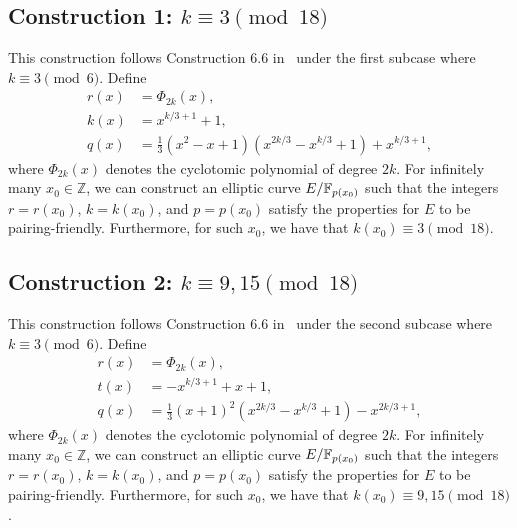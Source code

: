 
\subsection{Construction 1: $k \equiv 3 \pmod{18}$}
This construction follows Construction 6.6 in~\cite{2010/freeman}
under the first subcase where $k \equiv 3 \pmod{6}$.
Define
\begin{align*}
r(x) &= \Phi_{2k}(x),	\\
k(x) &= x^{k/3+1} + 1,	\\
q(x) &= \frac{1}{3} (x^2 - x + 1) (x^{2k/3} - x^{k/3} + 1) + x^{k/3+1},
\end{align*}
where $\Phi_{2k}(x)$ denotes the cyclotomic polynomial of degree $2k$. For infinitely many $x_{0}\in \mathbb{Z}$, we can construct an elliptic curve $E/\mathbb{F}_{p(x_{0})}$ such that the integers $r=r(x_{0})$, $k=k(x_{0})$, and $p=p(x_{0})$ satisfy the properties for $E$ to be pairing-friendly. Furthermore, for such $x_{0}$, we have that $k(x_{0}) \equiv 3 \pmod{18}$.


\subsection{Construction 2: $k \equiv 9,15 \pmod{18}$}
This construction follows Construction 6.6 in~\cite{2010/freeman}
under the second subcase where $k \equiv 3 \pmod{6}$.
Define
\begin{align*}
r(x) &= \Phi_{2k}(x),	\\
t(x) &= -x^{k/3+1} + x + 1,	\\
q(x) &= \frac{1}{3} (x+1)^2 (x^{2k/3} - x^{k/3} + 1) - x^{2k/3+1},
\end{align*}
where $\Phi_{2k}(x)$ denotes the cyclotomic polynomial of degree $2k$. For infinitely many $x_{0}\in \mathbb{Z}$, we can construct an elliptic curve $E/\mathbb{F}_{p(x_{0})}$ such that the integers $r=r(x_{0})$, $k=k(x_{0})$, and $p=p(x_{0})$ satisfy the properties for $E$ to be pairing-friendly. Furthermore, for such $x_{0}$, we have that
$k(x_{0}) \equiv 9,15 \pmod{18}$.


